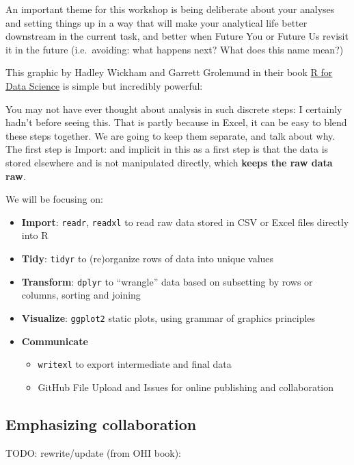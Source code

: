 \documentclass[]{book}
\providecommand{\tightlist}{%
  \setlength{\itemsep}{0pt}\setlength{\parskip}{0pt}}
\begin{document}
An important theme for this workshop is being deliberate about your analyses and setting things up in a way that will make your analytical life better downstream in the current task, and better when Future You or Future Us revisit it in the future (i.e.~avoiding: what happens next? What does this name mean?)

This graphic by Hadley Wickham and Garrett Grolemund in their book \href{http://r4ds.had.co.nz/}{R for Data Science} is simple but incredibly powerful:

You may not have ever thought about analysis in such discrete steps: I certainly hadn't before seeing this. That is partly because in Excel, it can be easy to blend these steps together. We are going to keep them separate, and talk about why. The first step is Import: and implicit in this as a first step is that the data is stored elsewhere and is not manipulated directly, which \textbf{keeps the raw data raw}.

We will be focusing on:

\begin{itemize}
\tightlist
\item
  \textbf{Import}: \texttt{readr}, \texttt{readxl} to read raw data stored in CSV or Excel files directly into R
\item
  \textbf{Tidy}: \texttt{tidyr} to (re)organize rows of data into unique values
\item
  \textbf{Transform}: \texttt{dplyr} to ``wrangle'' data based on subsetting by rows or columns, sorting and joining
\item
  \textbf{Visualize}: \texttt{ggplot2} static plots, using grammar of graphics principles
\item
  \textbf{Communicate}

  \begin{itemize}
  \tightlist
  \item
    \texttt{writexl} to export intermediate and final data
  \item
    GitHub File Upload and Issues for online publishing and collaboration
  \end{itemize}
\end{itemize}

\hypertarget{emphasizing-collaboration}{%
\subsection{Emphasizing collaboration}\label{emphasizing-collaboration}}

TODO: rewrite/update (from OHI book):
\end{document}
